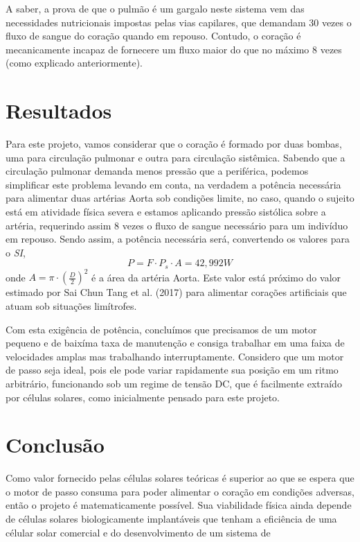 \documentclass[12pt, a4paper, twoside]{article}
\begin{document}
A saber, a prova de que o pulmão é um gargalo neste sistema vem das necessidades nutricionais impostas pelas vias capilares, que demandam 30 vezes o fluxo de sangue do coração quando em repouso. Contudo, o coração é mecanicamente incapaz de fornecere um fluxo maior do que no máximo 8 vezes (como explicado anteriormente).

\section{Resultados}

Para este projeto, vamos considerar que o coração é formado por duas bombas, uma para circulação pulmonar e outra para circulação sistêmica. Sabendo que a circulação pulmonar demanda menos pressão que a periférica, podemos simplificar este problema levando em conta, na verdadem a potência necessária para alimentar duas artérias Aorta sob condições limite, no caso, quando o sujeito está em atividade física severa e estamos aplicando pressão sistólica sobre a artéria, requerindo assim 8 vezes o fluxo de sangue necessário para um indivíduo em repouso. Sendo assim, a potência necessária será, convertendo os valores para o \textit{SI},
$$ P = F \cdot P_s \cdot A = 42,992 W $$
onde $A = \pi \cdot\left(\frac{D}{2}\right)^2$ é a área da artéria Aorta. Este valor está próximo do valor estimado por Sai Chun Tang et al. (2017) para alimentar corações artificiais que atuam sob situações limítrofes.

Com esta exigência de potência, concluímos que precisamos de um motor pequeno e de baixíma taxa de manutenção e consiga trabalhar em uma faixa de velocidades amplas mas trabalhando interruptamente. Considero que um motor de passo seja ideal, pois ele pode variar rapidamente sua posição em um ritmo arbitrário, funcionando sob um regime de tensão DC, que é facilmente extraído por células solares, como inicialmente pensado para este projeto.

\section{Conclusão}

 Como valor fornecido pelas células solares teóricas é superior ao que se espera que o motor de passo consuma para poder alimentar o coração em condições adversas, então o projeto é matematicamente possível. Sua viabilidade física ainda depende de células solares biologicamente implantáveis que tenham a eficiência de uma célular solar comercial e do desenvolvimento de um sistema de
\end{document}
